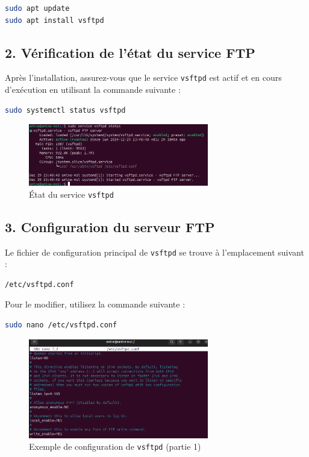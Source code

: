 \begin{lstlisting}[language=bash]
sudo apt update
sudo apt install vsftpd
\end{lstlisting}

\subsection*{2. V\'erification de l'\'etat du service FTP}
Apr\`es l'installation, assurez-vous que le service \texttt{vsftpd} est actif et en cours d'ex\'ecution en utilisant la commande suivante :

\begin{lstlisting}[language=bash]
sudo systemctl status vsftpd
\end{lstlisting}

\begin{figure}[h]
	\centering
	\includegraphics[width=0.7\textwidth]{FTP/status.png}
	\caption{\'Etat du service \texttt{vsftpd}}
	\label{fig:status}
\end{figure}

\subsection*{3. Configuration du serveur FTP}
Le fichier de configuration principal de \texttt{vsftpd} se trouve \`a l'emplacement suivant :

\begin{lstlisting}[language=bash]
/etc/vsftpd.conf
\end{lstlisting}

Pour le modifier, utilisez la commande suivante :

\begin{lstlisting}[language=bash]
sudo nano /etc/vsftpd.conf
\end{lstlisting} 
\newpage

\begin{figure}[h]
	\centering
	\includegraphics[width=0.7\textwidth]{FTP/vsftp-conf1.png}
	\caption{Exemple de configuration de \texttt{vsftpd} (partie 1)}
	\label{fig:conf1}
\end{figure}

